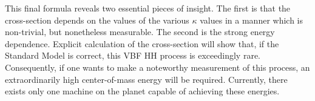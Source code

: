     This final formula reveals two essential pieces of insight.
    The first is that the cross-section depends on the values of the various $\kappa$ values in a manner which is non-trivial,
        but nonetheless measurable.
    The second is the strong energy dependence.
    Explicit calculation of the cross-section will show that, if the Standard Model is correct,
        this VBF \to HH process is exceedingly rare.
    Consequently, if one wants to make a noteworthy measurement of this process,
        an extraordinarily high center-of-mass energy will be required.
    Currently, there exists only one machine on the planet capable of achieving these energies.
